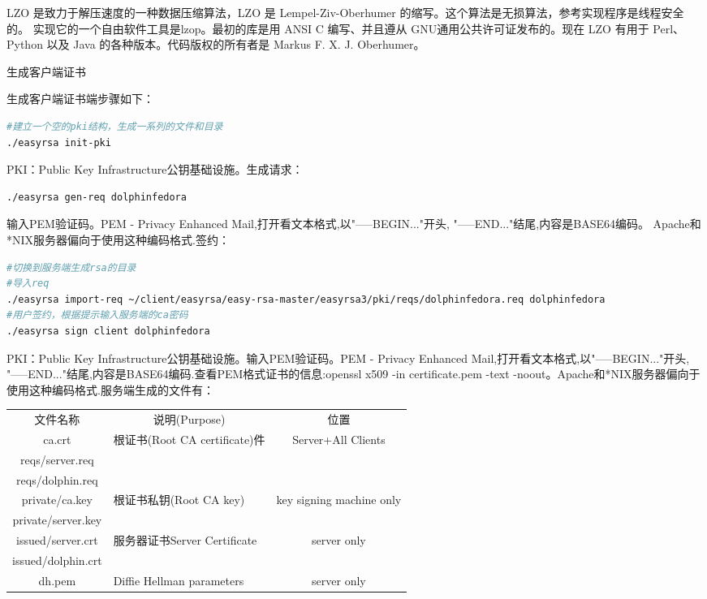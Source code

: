 \documentclass[12pt]{book}
\makeatletter
\numberwithin{dummy}{section}
\theoremstyle{ocrenumbox}
\theoremstyle{blacknumex}
\theoremstyle{blacknumbox}
\theoremstyle{ocrenum}
\renewcommand{\subsection}{\@startsection {subsection}{2}{\z@}
	{-3ex \@plus -0.1ex \@minus -.4ex}
	{0.5ex \@plus.2ex }
	{\normalfont\sffamily\bfseries}}
\makeatother
\begin{document}
LZO 是致力于解压速度的一种数据压缩算法，LZO 是 Lempel-Ziv-Oberhumer 的缩写。这个算法是无损算法，参考实现程序是线程安全的。 实现它的一个自由软件工具是lzop。最初的库是用 ANSI C 编写、并且遵从 GNU通用公共许可证发布的。现在 LZO 有用于 Perl、Python 以及 Java 的各种版本。代码版权的所有者是 Markus F. X. J. Oberhumer。

\subsection{生成客户端证书}

生成客户端证书端步骤如下：

\begin{lstlisting}[language=Bash]
#建立一个空的pki结构，生成一系列的文件和目录
./easyrsa init-pki
\end{lstlisting}

PKI：Public Key Infrastructure公钥基础设施。生成请求：

\begin{lstlisting}[language=Bash]
./easyrsa gen-req dolphinfedora
\end{lstlisting}

输入PEM验证码。PEM - Privacy Enhanced Mail,打开看文本格式,以"-----BEGIN..."开头, "-----END..."结尾,内容是BASE64编码。
Apache和*NIX服务器偏向于使用这种编码格式.签约：

\begin{lstlisting}[language=Bash]
#切换到服务端生成rsa的目录
#导入req
./easyrsa import-req ~/client/easyrsa/easy-rsa-master/easyrsa3/pki/reqs/dolphinfedora.req dolphinfedora
#用户签约，根据提示输入服务端的ca密码
./easyrsa sign client dolphinfedora
\end{lstlisting}

PKI：Public Key Infrastructure公钥基础设施。输入PEM验证码。PEM - Privacy Enhanced Mail,打开看文本格式,以"-----BEGIN..."开头, "-----END..."结尾,内容是BASE64编码.查看PEM格式证书的信息:openssl x509 -in certificate.pem -text -noout。Apache和*NIX服务器偏向于使用这种编码格式.服务端生成的文件有：

\begin{tabular}{|c|p{5cm}|c|}
	\hline
	\multirow{1}{*}{文件名称}
	& \multicolumn{1}{c|}{说明(Purpose)} 
	& \multicolumn{1}{c|}{位置} \\			
	\cline{1-3}
	ca.crt  & 根证书(Root CA certificate)件 & Server+All Clients	\\
	\hline
	reqs/server.req  & &\\
	\hline
	reqs/dolphin.req  & &\\
	\hline
	private/ca.key & 根证书私钥(Root CA key) & key signing machine only\\
	\hline
	private/server.key && \\
	\hline
	issued/server.crt & 服务器证书Server Certificate & server only\\
	\hline
	issued/dolphin.crt && \\
	\hline
	dh.pem & Diffie Hellman parameters & server only \\
	\hline
\end{tabular}
\end{document}
